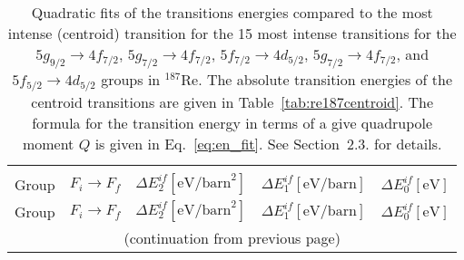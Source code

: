 \begin{longtable}{cc|rrr}
\caption{\label{tab:re187energ}%
Quadratic fits of the transitions energies compared to the most intense (centroid) transition for the 15 most intense transitions for the $5g_{9/2}\rightarrow4f_{7/2}$, $5g_{7/2}\rightarrow4f_{7/2}$, $5f_{7/2}\rightarrow4d_{5/2}$, $5g_{7/2}\rightarrow4f_{7/2}$, and $5f_{5/2}\rightarrow4d_{5/2}$ groups in $^{187}$Re. The absolute transition energies of the centroid transitions are given in Table~\ref{tab:re187centroid}. The formula for the transition energy in terms of a give quadrupole moment $Q$ is given in Eq.~\eqref{eq:en_fit}. See Section~2.3. for details.}
\\\hline\\[-10pt]\hline\\[-10pt]
\centering
Group& $F_i \rightarrow F_f$ & $\Delta E_2^{if} [\text{eV/barn}^2]$ & $\Delta E_1^{if} [\text{eV/barn}]$ & $\Delta E_0^{if} [\text{eV}]$\\[1pt]\hline\endfirsthead

Group& $F_i \rightarrow F_f$ & $\Delta E_2^{if} [\text{eV/barn}^2]$ & $\Delta E_1^{if} [\text{eV/barn}]$ & $\Delta E_0^{if} [\text{eV}]$\\[1pt]\hline
\multicolumn{5}{c}{{(continuation from previous page)}}\\
\endhead


\end{longtable}

